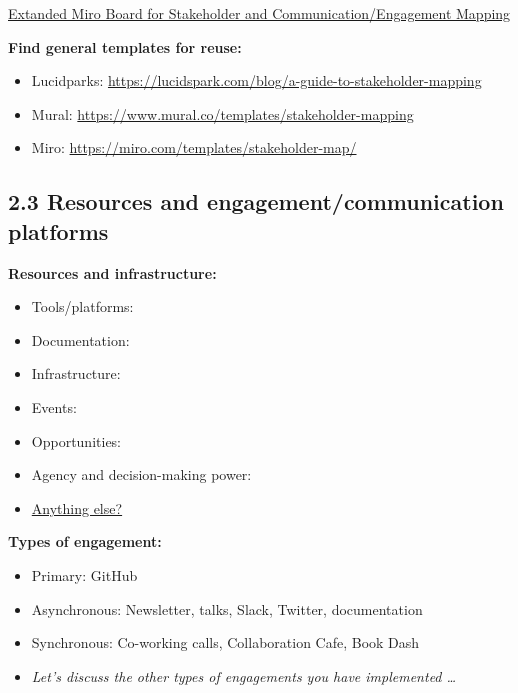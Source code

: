 \documentclass[
  letterpaper,
  DIV=11,
  numbers=noendperiod]{scrreport}
\providecommand{\tightlist}{%
  \setlength{\itemsep}{0pt}\setlength{\parskip}{0pt}}\usepackage{longtable,booktabs,array}
\begin{document}
\href{https://miro.com/app/board/uXjVMWzhGGc=/?share_link_id=996948844923}{Extanded
Miro Board for Stakeholder and Communication/Engagement Mapping}

\textbf{Find general templates for reuse:}

\begin{itemize}
\tightlist
\item
  Lucidparks:
  \url{https://lucidspark.com/blog/a-guide-to-stakeholder-mapping}
\item
  Mural: \url{https://www.mural.co/templates/stakeholder-mapping}
\item
  Miro: \url{https://miro.com/templates/stakeholder-map/}
\end{itemize}

\hypertarget{resources-and-engagementcommunication-platforms}{%
\subsection{\texorpdfstring{\textbf{2.3 Resources and
engagement/communication
platforms}}{2.3 Resources and engagement/communication platforms}}\label{resources-and-engagementcommunication-platforms}}

\textbf{Resources and infrastructure:}

\begin{itemize}
\tightlist
\item
  Tools/platforms:
\item
  Documentation:
\item
  Infrastructure:
\item
  Events:
\item
  Opportunities:
\item
  Agency and decision-making power:
\item
  \protect\hyperlink{anything-else}{Anything else?}
\end{itemize}

\textbf{Types of engagement:}

\begin{itemize}
\tightlist
\item
  Primary: GitHub
\item
  Asynchronous: Newsletter, talks, Slack, Twitter, documentation
\item
  Synchronous: Co-working calls, Collaboration Cafe, Book Dash
\item
  \emph{Let's discuss the other types of engagements you have
  implemented \ldots{}}
\end{itemize}
\end{document}
